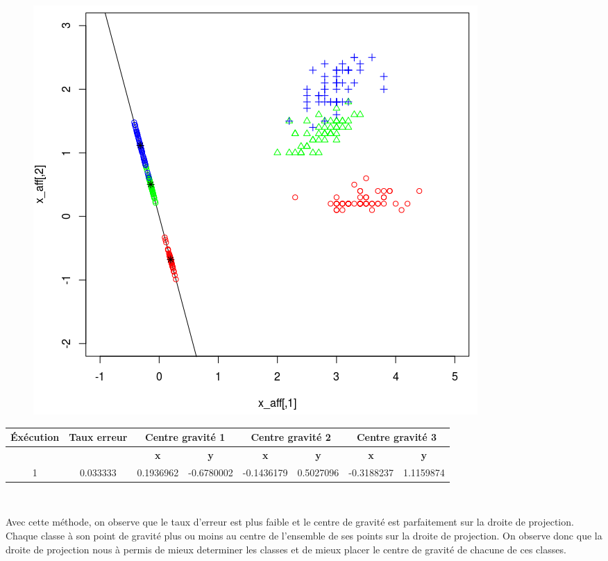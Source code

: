 \documentclass[a4paper,12pt]{report}
\begin{document}
\begin{figure}[!ht]
	\center
	\includegraphics[scale=0.3]{image/q3.png}
\end{figure}
\begin{center}

\begin{tabular}{|c|c|c|c|c|c|c|c|}
   \hline
   \cellcolor{gray!40}\textbf{Éxécution} & \cellcolor{gray!40}\textbf{Taux erreur} & \multicolumn{2}{c}{\cellcolor{gray!40}\textbf{Centre gravité 1}} & \multicolumn{2}{c}{\cellcolor{gray!40}\textbf{Centre gravité 2}} & \multicolumn{2}{c}{\cellcolor{gray!40}\textbf{Centre gravité 3}} \\
   \hline
   \cellcolor{gray!40}\textbf{ } & \cellcolor{gray!40}\textbf{ } & 		\cellcolor{gray!40}\textbf{x}& 		\cellcolor{gray!40}\textbf{y}& 		\cellcolor{gray!40}\textbf{x}& 		\cellcolor{gray!40}\textbf{y}& 		\cellcolor{gray!40}\textbf{x}& 		\cellcolor{gray!40}\textbf{y} \\
   \hline
   1 & 0.033333 & 0.1936962 & -0.6780002 & -0.1436179 & 0.5027096 & -0.3188237 & 1.1159874 \\
   \hline
\end{tabular}\\
\end{center}

Avec cette méthode, on observe que le taux d'erreur est plus faible et le centre de gravité est parfaitement sur la droite de projection. Chaque classe à son point de gravité plus ou moins au centre de l'ensemble de ses points sur la droite de projection. On observe donc que la droite de projection nous à permis de mieux determiner les classes et de mieux placer le centre de gravité de chacune de ces classes.
\end{document}
